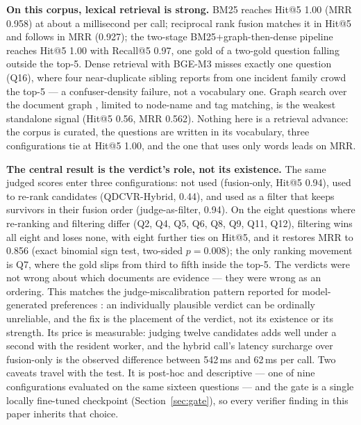 \textbf{On this corpus, lexical retrieval is strong.} BM25 \cite{bm25}
reaches Hit@5 1.00 (MRR 0.958) at about a millisecond per call; reciprocal
rank fusion \cite{rrf-cormack} matches it in Hit@5 and follows in MRR (0.927);
the two-stage BM25+graph-then-dense pipeline reaches Hit@5 1.00 with
Recall@5 0.97, one gold of a two-gold question falling outside the top-5.
Dense retrieval with BGE-M3 \cite{bge-m3} misses exactly one question (Q16),
where four near-duplicate sibling reports from one incident family crowd the
top-5 --- a confuser-density failure, not a vocabulary one. Graph search over
the document graph \cite{graphrag}, limited to node-name and tag matching, is
the weakest standalone signal (Hit@5 0.56, MRR 0.562). Nothing here is a
retrieval advance: the corpus is curated, the questions are written in its
vocabulary, three configurations tie at Hit@5 1.00, and the one that uses only
words leads on MRR.

\textbf{The central result is the verdict's role, not its existence.} The same
judged scores enter three configurations: not used (fusion-only, Hit@5 0.94),
used to re-rank candidates (QDCVR-Hybrid, 0.44), and used as a filter that
keeps survivors in their fusion order (judge-as-filter, 0.94). On the eight
questions where re-ranking and filtering differ (Q2, Q4, Q5, Q6, Q8, Q9, Q11,
Q12), filtering wins all eight and loses none, with eight further ties on
Hit@5, and it restores MRR to 0.856 (exact binomial sign test, two-sided
$p = 0.008$); the only ranking movement is Q7, where the gold slips from third
to fifth inside the top-5. The verdicts were not wrong about which documents
are evidence --- they were wrong as an ordering. This matches the
judge-miscalibration pattern reported for model-generated preferences
\cite{zheng-llmjudge,panickssery-selfpref}: an individually plausible verdict
can be ordinally unreliable, and the fix is the placement of the verdict, not
its existence or its strength. Its price is measurable: judging
twelve candidates adds well under a second with the resident worker, and the
hybrid call's latency surcharge over fusion-only is the observed difference
between 542\,ms and 62\,ms per call. Two caveats travel with the test. It is
post-hoc and descriptive --- one of nine configurations evaluated on the same
sixteen questions --- and the gate is a single locally fine-tuned checkpoint
(Section~\ref{sec:gate}), so every verifier finding in this paper inherits
that choice.

